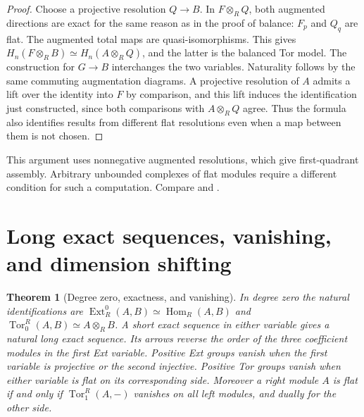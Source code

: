 \documentclass[11pt,oneside,openany]{book}
\newtheorem{theorem}{Theorem}[chapter]
\theoremstyle{definition}
\theoremstyle{remark}
\begin{document}
\begin{proof}
Choose a projective resolution \(Q\to B\). In
\(F\otimes_R Q\), both augmented directions are exact for
the same reason as in the proof of balance: \(F_p\) and \(Q_q\)
are flat. The augmented total maps are quasi-isomorphisms.
This gives \(H_n(F\otimes_R B)\simeq H_n(A\otimes_R Q)\), and
the latter is the balanced Tor model. The construction for
\(G\to B\) interchanges the two variables. Naturality follows
by the same commuting augmentation diagrams. A projective
resolution of \(A\) admits a lift over the identity into \(F\)
by comparison, and this lift induces the identification just
constructed, since both comparisons with \(A\otimes_R Q\)
agree. Thus the formula also identifies results from different
flat resolutions even when a map between them is not chosen.
\end{proof}

This argument uses nonnegative augmented resolutions, which give
first-quadrant assembly. Arbitrary unbounded complexes of flat
modules require a different condition for such a computation.
Compare \cite[Lemma 3.2.8]{weibel} and
\cite[Theorem 7.5]{rotman}.

\section{Long exact sequences, vanishing, and dimension shifting}

\begin{theorem}[Degree zero, exactness, and vanishing]
\label{p103:ALG-10-C03-R02}
In degree zero the natural identifications are
\(\operatorname{Ext}^0_R(A,B)\simeq\operatorname{Hom}_R(A,B)\) and
\(\operatorname{Tor}^R_0(A,B)\simeq A\otimes_R B\).
A short exact sequence in either variable gives a natural long
exact sequence. Its arrows reverse the order of the three
coefficient modules in the first Ext variable. Positive Ext groups
vanish when the first variable is projective or the second
injective. Positive Tor groups vanish when either variable is flat
on its corresponding side. Moreover a right module \(A\) is flat
if and only if \(\operatorname{Tor}^R_1(A,-)\) vanishes on all left
modules, and dually for the other side.
\end{theorem}
\end{document}
